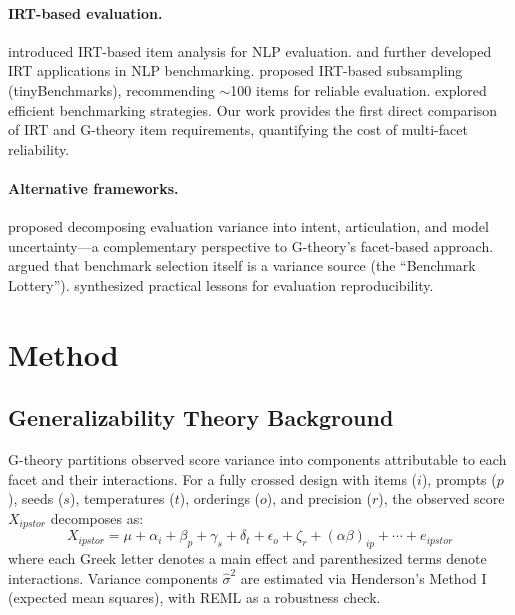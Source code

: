 \documentclass[letterpaper]{article}
\begin{document}
\paragraph{IRT-based evaluation.}
\citet{lalor2019learning} introduced IRT-based item analysis for NLP evaluation.
\citet{rodriguez2021evaluation} and \citet{vania2021comparing} further developed IRT applications in NLP benchmarking.
\citet{polo2024tinybenchmarks} proposed IRT-based subsampling (tinyBenchmarks), recommending $\sim$100 items for reliable evaluation.
\citet{perlitz2023efficient} explored efficient benchmarking strategies.
Our work provides the first direct comparison of IRT and G-theory item requirements, quantifying the cost of multi-facet reliability.

\paragraph{Alternative frameworks.}
\citet{kunievsky2025alternative} proposed decomposing evaluation variance into intent, articulation, and model uncertainty---a complementary perspective to G-theory's facet-based approach.
\citet{dehghani2021benchmark} argued that benchmark selection itself is a variance source (the ``Benchmark Lottery'').
\citet{biderman2024lessons} synthesized practical lessons for evaluation reproducibility.

\section{Method}

\subsection{Generalizability Theory Background}

G-theory \citep{shavelson1991generalizability, brennan2001generalizability} partitions observed score variance into components attributable to each facet and their interactions.
For a fully crossed design with items ($i$), prompts ($p$), seeds ($s$), temperatures ($t$), orderings ($o$), and precision ($r$), the observed score $X_{ipstor}$ decomposes as:
\begin{equation}
X_{ipstor} = \mu + \alpha_i + \beta_p + \gamma_s + \delta_t + \epsilon_o + \zeta_r + (\alpha\beta)_{ip} + \cdots + e_{ipstor}
\end{equation}
where each Greek letter denotes a main effect and parenthesized terms denote interactions.
Variance components $\hat{\sigma}^2$ are estimated via Henderson's Method I (expected mean squares), with REML as a robustness check.
\end{document}
